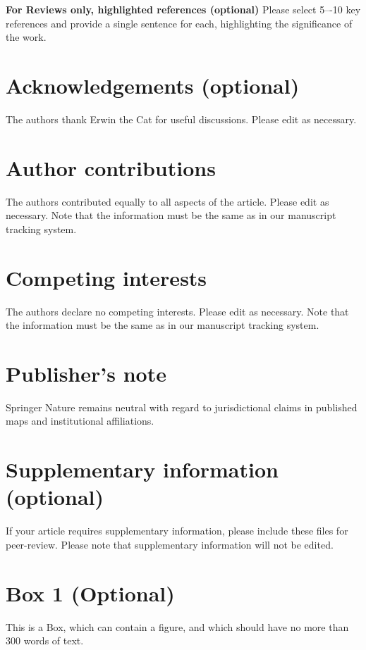 \documentclass[fleqn,10pt]{wlscirep}
\begin{document}
\noindent \textbf{For Reviews only, highlighted references (optional)} Please select 5–-10 key references and provide a single sentence for each, highlighting the significance of the work.

\section*{Acknowledgements (optional)}
The authors thank Erwin the Cat for useful discussions. Please edit as necessary.

\section*{Author contributions}
The authors contributed equally to all aspects of the article. Please edit as necessary. Note that the information must be the same as in our manuscript tracking system.

\section*{Competing interests}
The authors declare no competing interests. Please edit as necessary. Note that the information must be the same as in our manuscript tracking system.

\section*{Publisher’s note}
Springer Nature remains neutral with regard to jurisdictional claims in published maps and institutional affiliations.

\section*{Supplementary information (optional)}
If your article requires supplementary information, please include these files for peer-review. Please note that supplementary information will not be edited.

\newpage
\section*{Box 1 (Optional)}
This is a Box, which can contain a figure, and which should have no more than 300 words of text.
\end{document}
